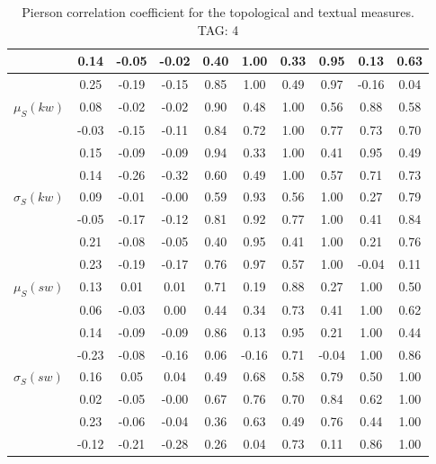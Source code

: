 \begin{table*}[h!]
\begin{center}
\begin{tabular}{| l | c | c | c | c | c | c | c | c | c |}
 & 0.14  & -0.05  & -0.02  & 0.40  & 1.00  & 0.33  & 0.95  & 0.13  & 0.63 \\\hline
 & 0.25  & -0.19  & -0.15  & 0.85  & 1.00  & 0.49  & 0.97  & -0.16  & 0.04 \\\hline
$\mu_S(kw)$ & 0.08  & -0.02  & -0.02  & 0.90  & 0.48  & 1.00  & 0.56  & 0.88  & 0.58 \\\hline
 & -0.03  & -0.15  & -0.11  & 0.84  & 0.72  & 1.00  & 0.77  & 0.73  & 0.70 \\\hline
 & 0.15  & -0.09  & -0.09  & 0.94  & 0.33  & 1.00  & 0.41  & 0.95  & 0.49 \\\hline
 & 0.14  & -0.26  & -0.32  & 0.60  & 0.49  & 1.00  & 0.57  & 0.71  & 0.73 \\\hline
$\sigma_S(kw)$ & 0.09  & -0.01  & -0.00  & 0.59  & 0.93  & 0.56  & 1.00  & 0.27  & 0.79 \\\hline
 & -0.05  & -0.17  & -0.12  & 0.81  & 0.92  & 0.77  & 1.00  & 0.41  & 0.84 \\\hline
 & 0.21  & -0.08  & -0.05  & 0.40  & 0.95  & 0.41  & 1.00  & 0.21  & 0.76 \\\hline
 & 0.23  & -0.19  & -0.17  & 0.76  & 0.97  & 0.57  & 1.00  & -0.04  & 0.11 \\\hline
$\mu_S(sw)$ & 0.13  & 0.01  & 0.01  & 0.71  & 0.19  & 0.88  & 0.27  & 1.00  & 0.50 \\\hline
 & 0.06  & -0.03  & 0.00  & 0.44  & 0.34  & 0.73  & 0.41  & 1.00  & 0.62 \\\hline
 & 0.14  & -0.09  & -0.09  & 0.86  & 0.13  & 0.95  & 0.21  & 1.00  & 0.44 \\\hline
 & -0.23  & -0.08  & -0.16  & 0.06  & -0.16  & 0.71  & -0.04  & 1.00  & 0.86 \\\hline
$\sigma_S(sw)$ & 0.16  & 0.05  & 0.04  & 0.49  & 0.68  & 0.58  & 0.79  & 0.50  & 1.00 \\\hline
 & 0.02  & -0.05  & -0.00  & 0.67  & 0.76  & 0.70  & 0.84  & 0.62  & 1.00 \\\hline
 & 0.23  & -0.06  & -0.04  & 0.36  & 0.63  & 0.49  & 0.76  & 0.44  & 1.00 \\\hline
 & -0.12  & -0.21  & -0.28  & 0.26  & 0.04  & 0.73  & 0.11  & 0.86  & 1.00 \\\hline
\end{tabular}
\caption{Pierson correlation coefficient for the topological and textual measures. TAG: 4}
\end{center}
\end{table*}